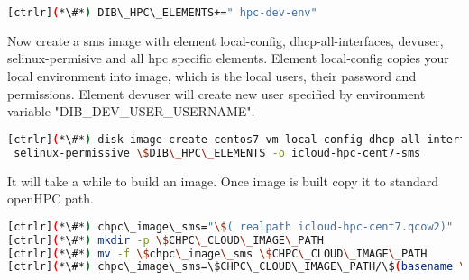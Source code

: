 \begin{lstlisting}[language=bash,keywords={}]
[ctrlr](*\#*) DIB\_HPC\_ELEMENTS+=" hpc-dev-env"
\end{lstlisting}

Now create a sms image with element local-config, dhcp-all-interfaces, devuser, selinux-permisive and all hpc specific elements. Element local-config copies your local environment into image, which is the local users, their password and permissions. Element devuser will create new user specified by environment variable "DIB\_DEV\_USER\_USERNAME". 

\begin{lstlisting}[language=bash,keywords={}]
[ctrlr](*\#*) disk-image-create centos7 vm local-config dhcp-all-interfaces devuser \
 selinux-permissive \$DIB\_HPC\_ELEMENTS -o icloud-hpc-cent7-sms
\end{lstlisting}

It will take a while to build an image. Once image is built copy it to standard openHPC path.

\begin{lstlisting}[language=bash,keywords={}]
[ctrlr](*\#*) chpc\_image\_sms="\$( realpath icloud-hpc-cent7.qcow2)"
[ctrlr](*\#*) mkdir -p \$CHPC\_CLOUD\_IMAGE\_PATH
[ctrlr](*\#*) mv -f \$chpc\_image\_sms \$CHPC\_CLOUD\_IMAGE\_PATH
[ctrlr](*\#*) chpc\_image\_sms=\$CHPC\_CLOUD\_IMAGE\_PATH/\$(basename \$chpc\_image\_sms)
\end{lstlisting}